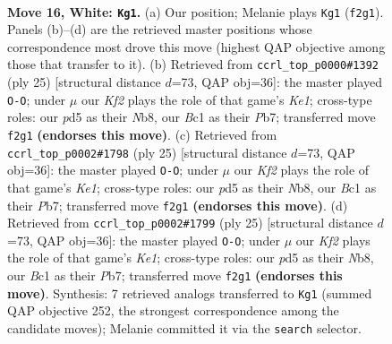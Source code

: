 \documentclass[11pt]{article}
\begin{document}
\clearpage

\begin{figure}[p]\centering
\begin{subfigure}{0.46\textwidth}\centering
\resizebox{\linewidth}{!}{%
\newchessgame
\chessboard[
  setfen={r1b1kbnr/4q3/6p1/p1ppPp2/5P1p/NP6/P3QKPP/R1B2B1R w kq - 0 16},
  showmover=false,
  pgfstyle=straightmove, color=movearrow, markmove={f2-g1}
]}
\caption{}
\end{subfigure}\hfill
\begin{subfigure}{0.46\textwidth}\centering
\resizebox{\linewidth}{!}{%
\newchessgame
\chessboard[
  setfen={rn1qk2r/1p2bpp1/3p4/p2Ppb1p/P7/1N2BP2/1PPQB1PP/R3K2R b KQkq - 0 13},
  showmover=false,
  pgfstyle=straightmove, color=movearrow, markmove={e8-g8}
]}
\caption{}
\end{subfigure}
\\[4pt]
\begin{subfigure}{0.46\textwidth}\centering
\resizebox{\linewidth}{!}{%
\newchessgame
\chessboard[
  setfen={rn1qk2r/1p2bpp1/3p4/p2Ppb1p/P7/1N2BP2/1PPQB1PP/R3K2R b KQkq - 0 13},
  showmover=false,
  pgfstyle=straightmove, color=movearrow, markmove={e8-g8}
]}
\caption{}
\end{subfigure}\hfill
\begin{subfigure}{0.46\textwidth}\centering
\resizebox{\linewidth}{!}{%
\newchessgame
\chessboard[
  setfen={rn1qk2r/1p2bpp1/3p4/p2Ppb1p/P7/1N2BP2/1PPQB1PP/R3K2R b KQkq - 0 13},
  showmover=false,
  pgfstyle=straightmove, color=movearrow, markmove={e8-g8}
]}
\caption{}
\end{subfigure}
\caption{\textbf{Move 16, White: \texttt{Kg1}.} (a) Our position; Melanie plays \texttt{Kg1} (\texttt{f2g1}). Panels (b)--(d) are the retrieved master positions whose correspondence most drove this move (highest QAP objective among those that transfer to it). (b) Retrieved from \texttt{ccrl\_top\_p0000\#1392} (ply 25) [structural distance $d$=73, QAP obj=36]: the master played \texttt{O-O}; under $\mu$ our \emph{Kf2} plays the role of that game's \emph{Ke1}; cross-type roles: our \emph{p}d5 as their \emph{N}b8, our \emph{B}c1 as their \emph{P}b7; transferred move \texttt{f2g1} \textbf{(endorses this move)}. (c) Retrieved from \texttt{ccrl\_top\_p0002\#1798} (ply 25) [structural distance $d$=73, QAP obj=36]: the master played \texttt{O-O}; under $\mu$ our \emph{Kf2} plays the role of that game's \emph{Ke1}; cross-type roles: our \emph{p}d5 as their \emph{N}b8, our \emph{B}c1 as their \emph{P}b7; transferred move \texttt{f2g1} \textbf{(endorses this move)}. (d) Retrieved from \texttt{ccrl\_top\_p0002\#1799} (ply 25) [structural distance $d$=73, QAP obj=36]: the master played \texttt{O-O}; under $\mu$ our \emph{Kf2} plays the role of that game's \emph{Ke1}; cross-type roles: our \emph{p}d5 as their \emph{N}b8, our \emph{B}c1 as their \emph{P}b7; transferred move \texttt{f2g1} \textbf{(endorses this move)}. Synthesis: 7 retrieved analogs transferred to \texttt{Kg1} (summed QAP objective 252, the strongest correspondence among the candidate moves); Melanie committed it via the \texttt{search} selector.}
\label{fig:thought-m30}
\end{figure}
\end{document}
